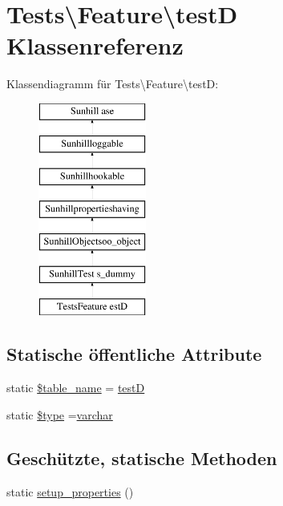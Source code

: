 \hypertarget{classTests_1_1Feature_1_1testD}{}\section{Tests\textbackslash{}Feature\textbackslash{}testD Klassenreferenz}
\label{classTests_1_1Feature_1_1testD}
Klassendiagramm für Tests\textbackslash{}Feature\textbackslash{}testD\+:\begin{figure}[H]
\begin{center}
\leavevmode
\includegraphics[height=7.000000cm]{d3/d72/classTests_1_1Feature_1_1testD}
\end{center}
\end{figure}
\subsection*{Statische öffentliche Attribute}
\begin{DoxyCompactItemize}
\item 
static \hyperlink{classTests_1_1Feature_1_1testD_a5434ad5f4f027504572a45f433f0e4b7}{\$table\+\_\+name} = \textquotesingle{}\hyperlink{classTests_1_1Feature_1_1testD}{testD}\textquotesingle{}
\item 
static \hyperlink{classTests_1_1Feature_1_1testD_a0a2381563543c2228fd0cd8082e430ca}{\$type} =\textquotesingle{}\hyperlink{classSunhill_1_1Objects_1_1oo__object_a31e144d542dfaf440b220525ae114826}{varchar}\textquotesingle{}
\end{DoxyCompactItemize}
\subsection*{Geschützte, statische Methoden}
\begin{DoxyCompactItemize}
\item 
static \hyperlink{classTests_1_1Feature_1_1testD_a8d5a79f3637ac23ffba15fd530a59bec}{setup\+\_\+properties} ()
\end{DoxyCompactItemize}

